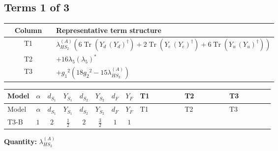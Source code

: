\documentclass[8pt]{article}
\begin{document}
\begin{landscape}
\subsection*{Terms 1 of 3}
\begin{center}
\begin{tabular}{@{}c >{\raggedright\arraybackslash}p{0.82\linewidth}@{}}
\toprule
Column & Representative term structure \\
\midrule
T1 & \(\displaystyle {\lambda_{HS_2}^{(A)}} (6 \operatorname{Tr}\!\left({Y_d}\,\left({Y_d}\right)^{\dagger}\right)+2 \operatorname{Tr}\!\left({Y_e}\,\left({Y_e}\right)^{\dagger}\right)+6 \operatorname{Tr}\!\left({Y_u}\,\left({Y_u}\right)^{\dagger}\right))\) \\
\midrule
T2 & \(\displaystyle +16 {\lambda_5} \left({\lambda_5}\right)^{*}\) \\
\midrule
T3 & \(\displaystyle +{g_1}^2 \left(18 {g_2}^2-15 {\lambda_{HS_2}^{(A)}}\right)\) \\
\midrule
\bottomrule
\end{tabular}
\end{center}
\smallskip
\tiny
\begin{longtable}{@{}llcccccc >{\raggedright\arraybackslash}p{0.21\linewidth} >{\raggedright\arraybackslash}p{0.21\linewidth} >{\raggedright\arraybackslash}p{0.21\linewidth}@{}}
\toprule
Model & $\alpha$ & $d_{S_1}$ & $Y_{S_1}$ & $d_{S_2}$ & $Y_{S_2}$ & $d_F$ & $Y_F$ & T1 & T2 & T3 \\
\midrule
\endfirsthead
\toprule
Model & $\alpha$ & $d_{S_1}$ & $Y_{S_1}$ & $d_{S_2}$ & $Y_{S_2}$ & $d_F$ & $Y_F$ & T1 & T2 & T3 \\
\midrule
\endhead
T3-B & $1$ & $2$ & $\frac{1}{2}$ & $2$ & $\frac{3}{2}$ & $1$ & $1$ & \scriptsize\adjustbox{max width=\linewidth}{$\begin{gathered} {\lambda_{HS_2}^{(A)}} (6 \operatorname{Tr}\!\left({Y_d}\,\left({Y_d}\right)^{\dagger}\right)+2 \operatorname{Tr}\!\left({Y_e}\,\left({Y_e}\right)^{\dagger}\right)+6 \operatorname{Tr}\!\left({Y_u}\,\left({Y_u}\right)^{\dagger}\right))\end{gathered}$} & \scriptsize\adjustbox{max width=\linewidth}{$\begin{gathered} +16 {\lambda_5} \left({\lambda_5}\right)^{*}\end{gathered}$} & \scriptsize\adjustbox{max width=\linewidth}{$\begin{gathered} +{g_1}^2 \left(18 {g_2}^2-15 {\lambda_{HS_2}^{(A)}}\right)\end{gathered}$} \\
\midrule
\bottomrule
\end{longtable}
\clearpage
\noindent\textbf{Quantity: }$\lambda_{HS_2}^{(A)}$\par\smallskip

\end{landscape}
\end{document}
